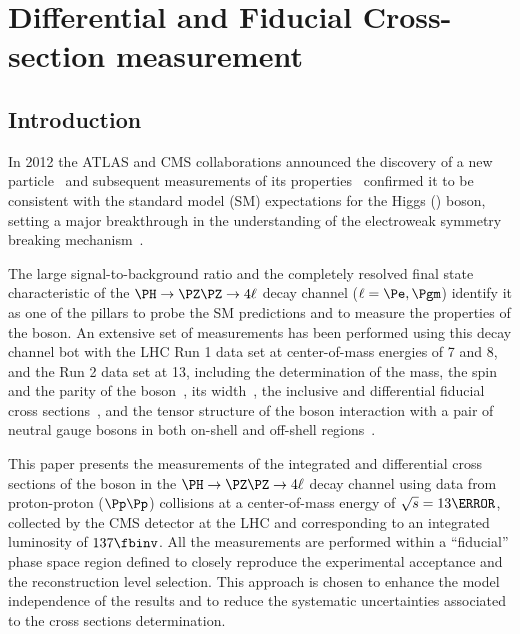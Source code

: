 \chapter{Differential and Fiducial Cross-section measurement}

\section{Introduction} \label{sec:intro}
In 2012 the ATLAS and CMS collaborations announced the discovery of a new particle~\cite{Aad:2012tfa,Chatrchyan:2012ufa,Chatrchyan:2013lba} and subsequent measurements of its properties~\cite{ATLASPropertiesRun1,CMSPropertiesRun1,ATLASCMSMassRun1,ATLASCMSPropertiesRun1} confirmed it to be consistent with the standard model (SM) expectations for the Higgs (\PH) boson, setting a major breakthrough in the understanding of the electroweak symmetry breaking mechanism~\cite{Englert:1964et,Higgs:1964ia,Higgs:1964pj,Guralnik:1964eu,Higgs:1966ev,Kibble:1967sv}.

The large signal-to-background ratio and the completely resolved final state characteristic of the $\HZZfl$ decay channel ($\ell=\Pe,\Pgm$) identify it as one of the pillars to probe the SM predictions and to measure the properties of the \PH boson.
An extensive set of measurements has been performed using this decay channel bot with the LHC Run 1 data set at center-of-mass energies of 7 and 8\TeV, and the Run 2 data set at 13\TeV, including the determination of
the mass, the spin and the parity of the \PH boson~\cite{ATLASH4lLegacyRun1,CMSH4lLegacyRun1,CMSH4lSpinParity,CMSH4lAnomalousCouplings,CMSH4l2016,ATLASH4l2016},
its width~\cite{CMSH4lWidth,CMSH4lLifetime,ATLASH4lWidth,ATLASH4lWidth2016}, the inclusive and differential fiducial cross sections~\cite{ATLASH4lFiducial8TeV,CMSH4lFiducial8TeV, CMSH4l2016,ATLASH4lFiducial2016, ATLASH4lLegacyRun2, ATLASH4lFiducialRun2}, and the tensor structure of the \PH boson interaction with a pair of neutral gauge bosons in both on-shell and off-shell regions~\cite{CMSH4lAnomalousCouplings,CMSH4lLifetime, CMSH4lAnomalousCouplings2016,ATLASH4l2016,CMSHVVAnomalousCouplings2016}.

This paper presents the measurements of the integrated and differential cross sections of the \PH boson in the $\HZZfl$ decay channel using data from proton-proton ($\Pp\Pp$) collisions at a center-of-mass energy of $\sqrt{s}=13\TeV$, collected by the CMS detector at the LHC and corresponding to an integrated luminosity of $\usedLumiABC$. 
All the measurements are performed within a ``fiducial'' phase space region defined to closely reproduce the experimental acceptance and the reconstruction level selection.
This approach is chosen to enhance the model independence of the results and to reduce the systematic uncertainties associated to the cross sections determination.

